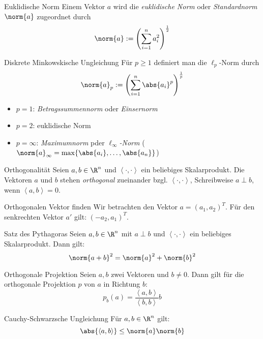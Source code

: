 \documentclass[german]{../spicker}
\newcommand{\scalarprod}[1]{\left\langle #1 \right\rangle}
\begin{document}
\begin{defi}{Euklidische Norm}
    Einem Vektor $a$ wird die \emph{euklidische Norm} oder \emph{Standardnorm} $\norm{a}$ zugeordnet durch
    $$
        \norm{a} := \left(\sum_{i=1}^n a_i^2\right)^{\frac{1}{2}}
    $$
\end{defi}

\begin{bonus}{Diskrete Minkowskische Ungleichung}
    Für $p \geq 1$ definiert man die $\ell_p$-Norm durch
    $$
        \norm{a}_p := \left(\sum^n_{i=1} \abs{a_i}^p\right)^\frac{1}{p}
    $$
    \begin{itemize}
        \item $p=1$: \emph{Betragssummennorm} oder \emph{Einsernorm}
        \item $p=2$: euklidische Norm
        \item $p=\infty$: \emph{Maximumnorm} pder $\ell_\infty$\emph{-Norm} ($\norm{a}_\infty = \max\{\abs{a_i}, \ldots, \abs{a_n}\}$)
    \end{itemize}
\end{bonus}

\begin{defi}{Orthogonalität}
    Seien $a,b \in \R^n$ und $\scalarprod{\cdot, \cdot}$ ein beliebiges Skalarprodukt.
    Die Vektoren $a$ und $b$ stehen \emph{orthogonal} zueinander bzgl. $\scalarprod{\cdot, \cdot}$, Schreibweise $a \perp b$, wenn $\scalarprod{a, b} = 0$.
\end{defi}

\begin{algo}{Orthogonalen Vektor finden}
    Wir betrachten den Vektor $a= (a_1, a_2)^T$.
    Für den senkrechten Vektor $a'$ gilt: $(-a_2, a_1)^T$.
\end{algo}

\begin{bonus}{Satz des Pythagoras}
    Seien $a,b \in \R^n$ mit $a \perp b$ und $\scalarprod{\cdot, \cdot}$ ein beliebiges Skalarprodukt.
    Dann gilt:
    $$
        \norm{a + b}^2 = \norm{a}^2 + \norm{b}^2
    $$
\end{bonus}

\begin{defi}{Orthogonale Projektion}
    Seien $a, b$ zwei Vektoren und $b \neq 0$. Dann gilt für die orthogonale Projektion $p$ von $a$ in Richtung $b$:
    $$
        p_b(a) = \frac{\scalarprod{a, b}}{\scalarprod{b, b}} b
    $$
\end{defi}

\begin{bonus}{Cauchy-Schwarzsche Ungleichung}
    Für $a, b \in \R^n$ gilt:
    $$
        \abs{\scalarprod{a, b}} \leq \norm{a} \norm{b}
    $$
\end{bonus}
\end{document}
